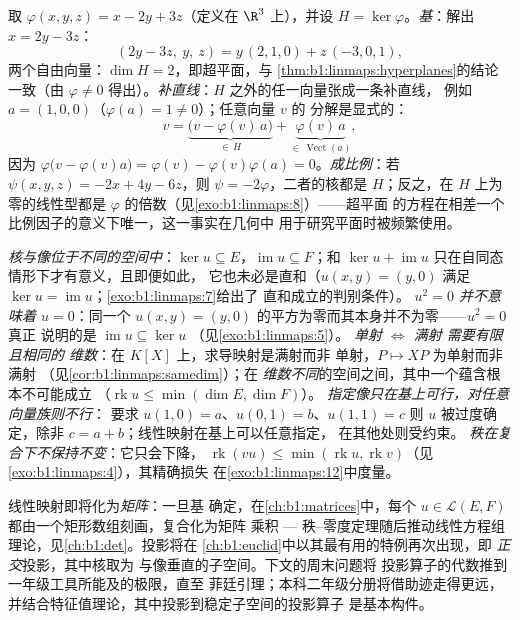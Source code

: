 \begin{example}[同一超平面的三种处理]
\label{ex:b1:linmaps:hyperplanerun}
取 $\varphi(x, y, z) = x - 2y + 3z$（定义在 $\R^3$ 上），并设 $H =
\ker\varphi$。\emph{基}：解出 $x = 2y - 3z$：
\[
(2y - 3z,\ y,\ z) = y\,(2, 1, 0) + z\,(-3, 0, 1),
\]
两个自由向量：$\dim H = 2$，即超平面，与
\cref{thm:b1:linmaps:hyperplanes}的结论一致（由 $\varphi \neq
0$ 得出）。\emph{补直线}：$H$ 之外的任一向量张成一条补直线，
例如 $a = (1, 0, 0)$（$\varphi(a) = 1 \neq 0$）；任意向量 $v$ 的
分解是显式的：
\[
v = \underbrace{\bigl(v - \varphi(v)\,a\bigr)}_{\in\,H}
+ \underbrace{\varphi(v)\,a}_{\in\,\operatorname{Vect}(a)},
\]
因为 $\varphi\bigl(v - \varphi(v)a\bigr) = \varphi(v) -
\varphi(v)\varphi(a) = 0$。\emph{成比例}：若 $\psi(x,y,z)
= -2x + 4y - 6z$，则 $\psi = -2\varphi$，二者的核都是
$H$；反之，在 $H$ 上为零的线性型都是
$\varphi$ 的倍数（见\cref{exo:b1:linmaps:8}）——超平面
的方程在相差一个比例因子的意义下唯一，这一事实在几何中
用于研究平面时被频繁使用。
\end{example}

\begin{remark}[常见误区]
\label{rem:b1:linmaps:pitfalls}
\emph{核与像位于不同的空间中}：$\ker u
\subseteq E$，$\operatorname{im} u \subseteq F$；和 $\ker u
+ \operatorname{im} u$ 只在自同态情形下才有意义，且即便如此，
它也未必是直和（$u(x, y) = (y, 0)$ 满足 $\ker u
= \operatorname{im} u$；\cref{exo:b1:linmaps:7}给出了
直和成立的判别条件）。
\emph{$u^2 = 0$ 并不意味着 $u = 0$}：同一个 $u(x,y) =
(y, 0)$ 的平方为零而其本身并不为零——$u^2 = 0$ 真正
说明的是 $\operatorname{im} u \subseteq \ker u$
（见\cref{exo:b1:linmaps:5}）。
\emph{单射 $\iff$ 满射 需要有限且相同的
维数}：在 $K[X]$ 上，求导映射是满射而非
单射，$P \mapsto XP$ 为单射而非满射
（见\cref{cor:b1:linmaps:samedim}）；在
\emph{维数不同}的空间之间，其中一个蕴含根本不可能成立
（$\operatorname{rk} u \leq \min(\dim E, \dim F)$）。
\emph{指定像只在基上可行，对任意向量族则不行}：
要求 $u(1, 0) = a$、$u(0, 1) = b$、$u(1, 1) = c$
则 $u$ 被过度确定，除非 $c = a + b$；线性映射在基上可以任意指定，
在其他处则受约束。
\emph{秩在复合下不保持不变}：它只会下降，
$\operatorname{rk}(vu) \leq \min(\operatorname{rk} u,
\operatorname{rk} v)$（见\cref{exo:b1:linmaps:4}），其精确损失
在\cref{exo:b1:linmaps:12}中度量。
\end{remark}

\begin{remark}[这些映射的用途]
\label{rem:b1:linmaps:whereused}
线性映射即将化为\emph{矩阵}：一旦基
确定，在\cref{ch:b1:matrices}中，每个 $u \in \mathcal{L}(E,
F)$ 都由一个矩形数组刻画，复合化为矩阵
乘积 --- 秩–零度定理随后推动线性方程组
理论，见\cref{ch:b1:det}。投影将在
\cref{ch:b1:euclid}中以其最有用的特例再次出现，即
\emph{正交}投影，其中核取为
与像垂直的子空间。下文的周末问题将
投影算子的代数推到一年级工具所能及的极限，直至
菲廷引理；本科二年级分册将借助迹走得更远，
并结合特征值理论，其中投影到稳定子空间的投影算子
是基本构件。
\end{remark}

